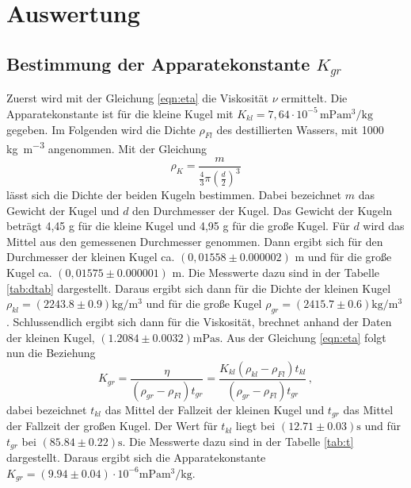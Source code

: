 \section{Auswertung}
\label{sec:Auswertung}
\subsection{Bestimmung der Apparatekonstante \texorpdfstring{$K_{gr}$}{math}}
\label{sec:BdA}
Zuerst wird mit der Gleichung \eqref{eqn:eta}
die Viskosität $\nu$ ermittelt.
Die Apparatekonstante ist für die kleine Kugel mit $K_{kl} = 7,64 \cdot 10^{-5}
\,\si{\milli\pascal\meter\tothe{3}\per\kilo\gram} $
gegeben. Im Folgenden wird die Dichte $\rho_{Fl}$ des destillierten Wassers, mit
1000 \si{\kilo\gram\per\meter\tothe{3}} angenommen. Mit der Gleichung
\begin{equation*}
  \rho_{K} = \frac{m}{\frac{4}{3}\pi\left(\frac{d}{2}\right)^3}
\end{equation*}
lässt sich die Dichte der beiden Kugeln bestimmen. Dabei bezeichnet $m$ das
Gewicht der Kugel und $d$ den Durchmesser der Kugel. Das Gewicht der Kugeln
beträgt 4,45 \si{\gram} für die kleine Kugel und 4,95 \si{\gram} für die große
Kugel. Für $d$ wird das Mittel aus den gemessenen Durchmesser genommen. Dann
ergibt sich für den Durchmesser der kleinen Kugel ca. $(0,01558 \pm 0.000002)$ \si{\meter} und
für die große Kugel ca. $(0,01575\pm 0.000001)$ \si{\meter}.
Die Messwerte  dazu sind in der Tabelle \ref{tab:dtab} dargestellt.
Daraus ergibt sich dann für die Dichte der kleinen Kugel $\rho_{kl} =
(2243.8 \pm 0.9) \si{\kilo\gram\per\meter\tothe{3}}$ und für die große Kugel
$\rho_{gr} = (2415.7 \pm 0.6) \si{\kilo\gram\per\meter\tothe{3}} $.
Schlussendlich ergibt sich dann
für die Viskosität, brechnet anhand der Daten der kleinen Kugel,
$(1.2084 \pm 0.0032)\si{\milli\pascal\second}$.
Aus der Gleichung \eqref{eqn:eta} folgt nun die Beziehung
\begin{equation*}
  K_{gr} = \frac{\eta}{(\rho_{gr} - \rho_{Fl})t_{gr}}
        = \frac{K_{kl} (\rho_{kl} - \rho_{Fl})t_{kl}}{(\rho_{gr} - \rho_{Fl})t_{gr}}\, ,
\end{equation*}
dabei bezeichnet $t_{kl}$ das Mittel der Fallzeit der kleinen Kugel und $t_{gr}$
das Mittel der Fallzeit der großen Kugel. Der Wert für $t_{kl}$ liegt bei
$(12.71 \pm 0.03) \si{\second}$ und für $t_{gr}$ bei $(85.84 \pm 0.22)
\si{\second}$.
Die Messwerte dazu sind in der Tabelle \ref{tab:t} dargestellt.
Daraus ergibt sich die Apparatekonstante $K_{gr}  = (9.94 \pm 0.04)
\cdot 10^{-6} \si{\milli\pascal\meter\tothe{3}\per\kilo\gram}$.
